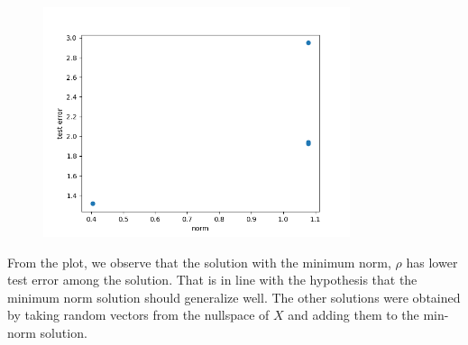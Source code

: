 
\begin{answer}
\begin{figure}[H]
    \centering
    \includegraphics[width=9cm]{implicitreg/implicitreg_linear.png}
\end{figure}
From the plot, we observe that the solution with the minimum norm, $\rho$ has lower test error among the solution. That is in line with the hypothesis that the minimum norm solution should generalize well.
The other solutions were obtained by taking random vectors from the nullspace of $X$ and adding them to the min-norm solution.
\end{answer}